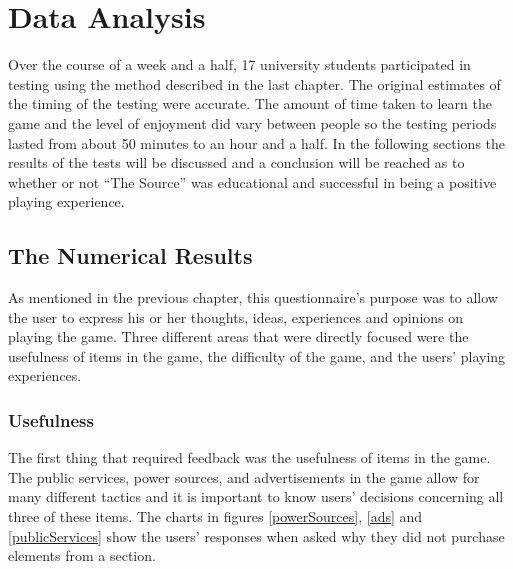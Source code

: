 \documentclass[msc,oneside]{ubcthesis}%
\begin{document}




\chapter{Data Analysis}

\indent Over the course of a week and a half, 17 university students participated in testing using the method described in the last chapter. The original estimates of the timing of the testing were accurate. The amount of time taken to learn the game and the level of enjoyment did vary between people so the testing periods lasted from about 50 minutes to an hour and a half. In the following sections the results of the tests will be discussed and a conclusion will be reached as to whether or not ``The Source'' was educational and successful in being a positive playing experience.

\section{The Numerical Results}
As mentioned in the previous chapter, this questionnaire's purpose was to allow the user to express his or her thoughts, ideas, experiences and opinions on playing the game. Three different areas that were directly focused were the usefulness of items in the game, the difficulty of the game, and the users' playing experiences. 

\subsection{Usefulness}
\indent The first thing that required feedback was the usefulness of items in the game. The public services, power sources, and advertisements in the game allow for many different tactics and it is important to know users' decisions concerning all three of these items. The charts in figures \ref{powerSources}, \ref{ads} and \ref{publicServices} show the users' responses when asked why they did not purchase elements from a section.
 
\end{document}
